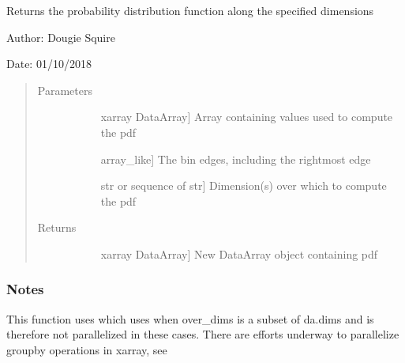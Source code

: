 \documentclass[letterpaper,10pt,english]{sphinxmanual}
\begin{document}
\begin{fulllineitems}
\label{\detokenize{utils_doc:utils.pdf}}
Returns the probability distribution function along the specified dimensions

\begin{DUlineblock}{0em}
\item[] Author: Dougie Squire
\item[] Date: 01/10/2018
\end{DUlineblock}
\begin{quote}\begin{description}
\item[{Parameters}] \leavevmode\begin{description}
\item[{}] \leavevmode{[}xarray DataArray{]}
Array containing values used to compute the pdf

\item[{}] \leavevmode{[}array\_like{]}
The bin edges, including the rightmost edge

\item[{}] \leavevmode{[}str or sequence of str{]}
Dimension(s) over which to compute the pdf

\end{description}

\item[{Returns}] \leavevmode\begin{description}
\item[{}] \leavevmode{[}xarray DataArray{]}
New DataArray object containing pdf

\end{description}

\end{description}\end{quote}
\subsubsection*{Notes}

This function uses  which uses  when over\_dims is a subset                 of da.dims and is therefore not parallelized in these cases. There are efforts underway to parallelize                 groupby operations in xarray, see 

\end{fulllineitems}
\end{document}

